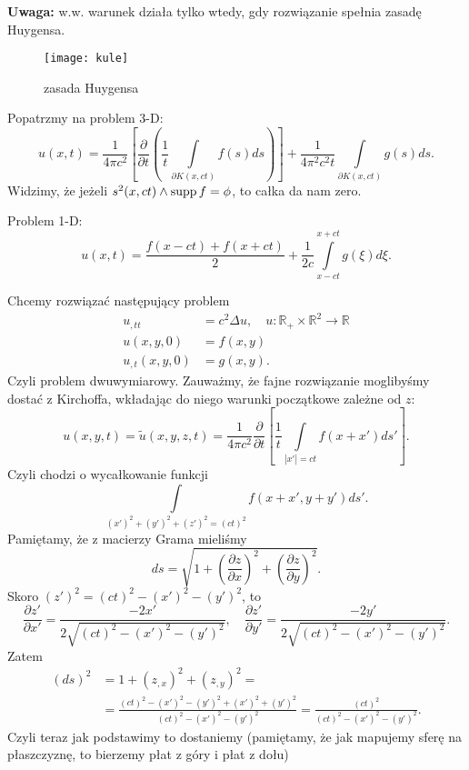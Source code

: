 \documentclass[../main.tex]{subfiles}
\begin{document}
		\textbf{Uwaga:} w.w. warunek działa tylko wtedy, gdy rozwiązanie spełnia zasadę Huygensa.
		\begin{figure}[h]
				\centering
				\texttt{[image: kule]}
				\caption{zasada Huygensa}
				\label{fig:kule}
		\end{figure}
		\begin{przyklad}
				Popatrzmy na problem 3-D:
				\[
						u(x,t) = \frac{1}{4\pi c^2} \left[ \frac{\partial }{\partial t} \left( \frac{1}{t}\int\limits_{\partial K(x,ct)}f(s)d s \right)  \right] + \frac{1}{4\pi^2c^2 t}\int\limits_{\partial K(x,ct)}g(s)d s
				.\]
				Widzimy, że jeżeli $s^2(x,ct)\land \operatorname{supp} f = \phi$, to całka da nam zero.
		\end{przyklad}
		\begin{przyklad}
				Problem 1-D:
				\[
						u(x,t) = \frac{f(x-ct) + f(x+ct)}{2} + \frac{1}{2c}\int\limits_{x-ct}^{x+ct}g(\xi)d\xi
				.\]
		\end{przyklad}
		Chcemy rozwiązać następujący problem
		\begin{align*}
				u_{,t t} &= c^2 \Delta u,\quad u: \mathbb{R}_+ \times \mathbb{R}^2 \to \mathbb{R}\\
				u(x,y,0) &= f(x,y)\\
				u_{,t}(x,y,0) &= g(x,y)
		.\end{align*}
		Czyli problem dwuwymiarowy. Zauważmy, że fajne rozwiązanie moglibyśmy dostać z Kirchoffa, wkładając do niego warunki początkowe zależne od $z$:
		\[
				u(x,y,t) = \tilde u(x,y,z,t) = \frac{1}{4\pi c^2}\frac{\partial }{\partial t} \left[ \frac{1}{t}\int\limits_{|x'| = ct}f(x+x')d s' \right]
		.\]
		Czyli chodzi o wycałkowanie funkcji
		\[
				\int\limits_{(x')^2 + (y')^2 + (z')^2 = (ct)^2}f(x+x',y+y')d s'
		.\]
		Pamiętamy, że z macierzy Grama mieliśmy
		\[
				d s = \sqrt{1+\left( \frac{\partial z}{\partial x}\right) ^2 + \left(\frac{\partial z}{\partial y}  \right) ^2}
		.\]
		Skoro $(z')^2 = (ct)^2 - (x')^2 - (y')^2$, to
		\[
				\frac{\partial z'}{\partial x'} = \frac{-2x'}{2\sqrt{(ct)^2 - (x')^2 - (y')^2} },\quad \frac{\partial z'}{\partial y'} = \frac{-2y'}{2\sqrt{(ct)^2 - (x')^2 - (y')^2} }
		.\]
		Zatem
		\begin{align*}
				(d s)^2 &= 1 + (z_{,x})^2 + (z_{,y})^2 = \\
				&= \frac{(ct)^2 - (x')^2 - (y')^2 + (x')^2 + (y')^2}{(ct)^2 - (x')^2 - (y')^2} = \frac{(ct)^2}{(ct)^2 - (x')^2 - (y')^2}
		.\end{align*}
		Czyli teraz jak podstawimy to dostaniemy (pamiętamy, że jak mapujemy sferę na płaszczyznę, to bierzemy płat z góry i płat z dołu)
\end{document}
